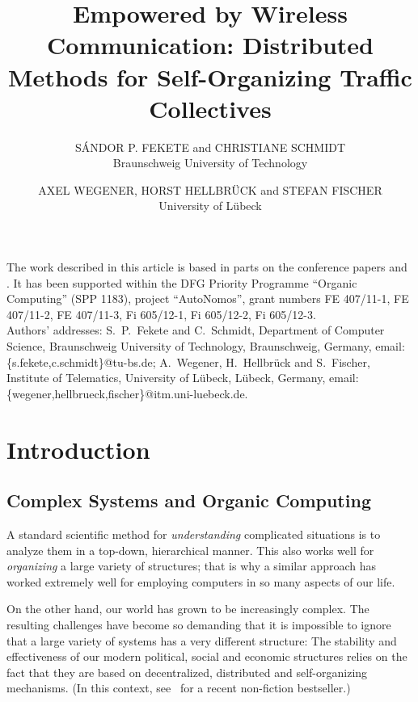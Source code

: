 \documentclass{acmrip}
\title{Empowered by Wireless Communication:
Distributed Methods for Self-Organizing Traffic Collectives}
\author{S\'{A}NDOR P. FEKETE  and CHRISTIANE SCHMIDT \\ Braunschweig University of Technology\and AXEL WEGENER, HORST HELLBR\"UCK and STEFAN FISCHER \\ University of L\"ubeck }
\begin{document}
    \begin{bottomstuff}
    The work described in this article is based in parts on the conference papers \cite{fsw+-hdcrtj-06} and \cite{We2007AutoCast}. It has been supported within the
DFG Priority Programme ``Organic
    Computing'' (SPP 1183), project ``AutoNomos'', grant numbers FE 407/11-1, FE 407/11-2, FE 407/11-3, Fi 605/12-1, Fi 605/12-2, Fi 605/12-3.\\
    Authors' addresses: S.\ P.\ Fekete and C.\ Schmidt, Department of Computer Science, Braunschweig
    University of Technology, Braunschweig, Germany,
    email:\{s.fekete,c.schmidt\}@tu-bs.de; A.\ Wegener, H.\ Hellbr\"uck and
    S.\ Fischer, Institute of Telematics, University of L\"ubeck,
    L\"ubeck, Germany, email:\{wegener,hellbrueck,fischer\}@itm.uni-luebeck.de.
    \end{bottomstuff}
    \maketitle
\section{Introduction}

\subsection{Complex Systems and Organic Computing}
A standard scientific method for {\em understanding} complicated situations is
to analyze them in a top-down, hierarchical manner.  This also works
well for {\em organizing} a large variety of structures; that is why a similar
approach has worked extremely well for employing
computers in so many aspects of our life.

On the other hand, our world has grown to be increasingly complex. The
resulting challenges have become so demanding that it is impossible to ignore
that a large variety of systems has a very different structure: The stability
and effectiveness of our modern political, social and economic structures
relies on the fact that they are based on decentralized, distributed and
self-organizing mechanisms. (In this context, see~\cite{s-wc-04} for a recent
non-fiction bestseller.)
\end{document}
